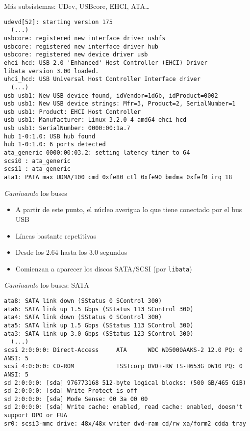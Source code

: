 \documentclass[presentation]{beamer}
\begin{document}
\begin{frame}[label={sec:orgcf1de37},fragile]{Más subsistemas: UDev, USBcore, EHCI, ATA\ldots{}}
 \begin{verbatim}
udevd[52]: starting version 175
  (...)
usbcore: registered new interface driver usbfs
usbcore: registered new interface driver hub
usbcore: registered new device driver usb
ehci_hcd: USB 2.0 'Enhanced' Host Controller (EHCI) Driver
libata version 3.00 loaded.
uhci_hcd: USB Universal Host Controller Interface driver
  (...)
usb usb1: New USB device found, idVendor=1d6b, idProduct=0002
usb usb1: New USB device strings: Mfr=3, Product=2, SerialNumber=1
usb usb1: Product: EHCI Host Controller
usb usb1: Manufacturer: Linux 3.2.0-4-amd64 ehci_hcd
usb usb1: SerialNumber: 0000:00:1a.7
hub 1-0:1.0: USB hub found
hub 1-0:1.0: 6 ports detected
ata_generic 0000:00:03.2: setting latency timer to 64
scsi0 : ata_generic
scsi1 : ata_generic
ata1: PATA max UDMA/100 cmd 0xfe80 ctl 0xfe90 bmdma 0xfef0 irq 18
\end{verbatim}
\end{frame}

\begin{frame}[label={sec:org876fbcd},fragile]{\emph{Caminando} los buses}
 \begin{itemize}
\item A partir de este punto, el núcleo averigua lo que tiene conectado
por el bus USB
\item Líneas bastante repetitivas
\item Desde los 2.64 hasta los 3.0 segundos
\item Comienzan a aparecer los discos SATA/SCSI (por \texttt{libata})
\end{itemize}
\end{frame}

\begin{frame}[label={sec:org2fe1327},fragile]{\emph{Caminando} los buses: SATA}
 \begin{verbatim}
ata8: SATA link down (SStatus 0 SControl 300)
ata6: SATA link up 1.5 Gbps (SStatus 113 SControl 300)
ata4: SATA link down (SStatus 0 SControl 300)
ata5: SATA link up 1.5 Gbps (SStatus 113 SControl 300)
ata3: SATA link up 3.0 Gbps (SStatus 123 SControl 300)
  (...)
scsi 2:0:0:0: Direct-Access     ATA      WDC WD5000AAKS-2 12.0 PQ: 0 ANSI: 5
scsi 4:0:0:0: CD-ROM            TSSTcorp DVD+-RW TS-H653G DW10 PQ: 0 ANSI: 5
sd 2:0:0:0: [sda] 976773168 512-byte logical blocks: (500 GB/465 GiB)
sd 2:0:0:0: [sda] Write Protect is off
sd 2:0:0:0: [sda] Mode Sense: 00 3a 00 00
sd 2:0:0:0: [sda] Write cache: enabled, read cache: enabled, doesn't support DPO or FUA
sr0: scsi3-mmc drive: 48x/48x writer dvd-ram cd/rw xa/form2 cdda tray
\end{verbatim}
\end{frame}
\end{document}
